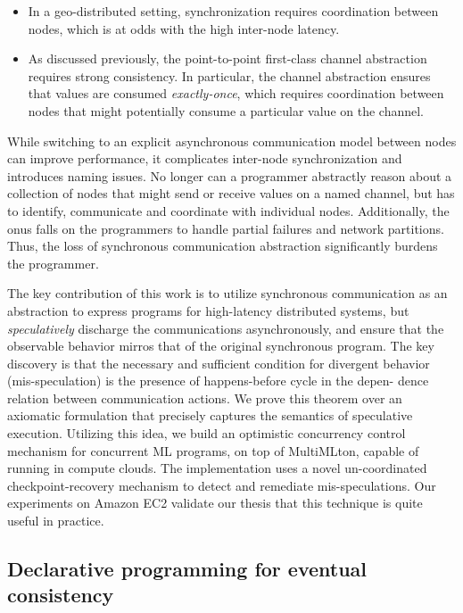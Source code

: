 \begin{itemize}
\item In a geo-distributed setting, synchronization requires coordination
between nodes, which is at odds with the high inter-node latency.
\item As discussed previously, the point-to-point first-class channel
abstraction requires strong consistency. In particular, the channel abstraction
ensures that values are consumed \emph{exactly-once}, which requires
coordination between nodes that might potentially consume a particular value on
the channel.
\end{itemize}

While switching to an explicit asynchronous communication model between nodes
can improve performance, it complicates inter-node synchronization and
introduces naming issues. No longer can a programmer abstractly reason about a
collection of nodes that might send or receive values on a named channel, but
has to identify, communicate and coordinate with individual nodes.
Additionally, the onus falls on the programmers to handle partial failures and
network partitions. Thus, the loss of synchronous communication abstraction
significantly burdens the programmer.

The key contribution of this work is to utilize synchronous communication as an
abstraction to express programs for high-latency distributed systems, but
\emph{speculatively} discharge the communications asynchronously, and ensure
that the observable behavior mirros that of the original synchronous program.
The key discovery is that the necessary and sufficient condition for divergent
behavior (mis-speculation) is the presence of happens-before cycle in the
depen- dence relation between communication actions. We prove this theorem over
an axiomatic formulation that precisely captures the semantics of speculative
execution. Utilizing this idea, we build an optimistic concurrency control
mechanism for concurrent ML programs, on top of MultiMLton, capable of running
in compute clouds. The implementation uses a novel un-coordinated
checkpoint-recovery mechanism to detect and remediate mis-speculations. Our
experiments on Amazon EC2 validate our thesis that this technique is quite
useful in practice.

\subsection{Declarative programming for eventual consistency}

